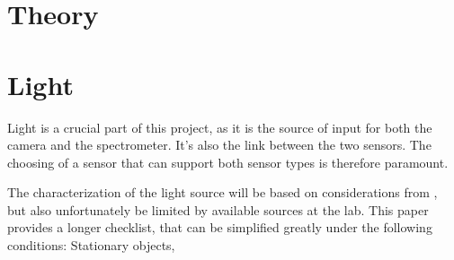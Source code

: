 \documentclass{article}
\begin{document}
\section{Theory}



\section{Light}
Light is a crucial part of this project, as it is the source of input for both the camera and the spectrometer. It's also the link between the two sensors. The choosing of a sensor that can support both sensor types is therefore paramount. 

The characterization of the light source will be based on considerations from \cite{martinPracticalGuideMachine}, but also unfortunately be limited by available sources at the lab. This paper provides a longer checklist, that can be simplified greatly under the following conditions: Stationary objects,






\end{document}
